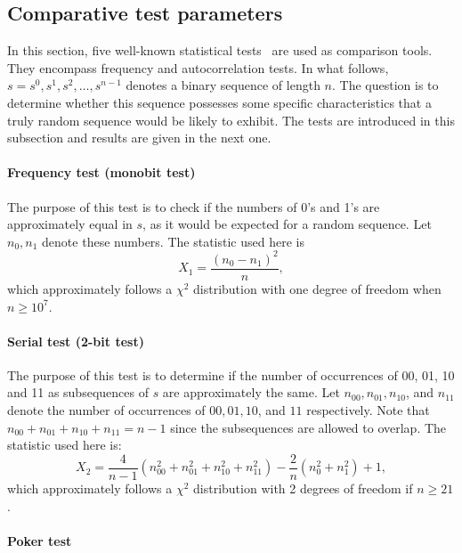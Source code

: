 \subsection{Comparative test parameters}

In this section, five well-known statistical tests~\cite{Menezes1997} are used as  comparison tools. They encompass frequency and autocorrelation tests. In what follows, $s = s^0,s^1,s^2,\dots , s^{n-1}$ denotes a binary sequence of length $n$. The question is to determine whether this sequence possesses some specific characteristics that a truly random sequence would be likely to exhibit. The tests are introduced in this subsection and results are given in the next one.

\paragraph{Frequency test (monobit test)}

The purpose of this test is to check if the numbers of 0's and 1's are approximately equal in $s$, as it would be expected for a random sequence. Let $n_0, n_1$ denote these numbers. The statistic used here is 
\begin{equation*}
X_1=\frac{(n_0-n_1)^2}{n}, 
\end{equation*}
which approximately follows a $\chi^2$ distribution with one degree of freedom when $n\geqslant 10^7$.

\paragraph{Serial test (2-bit test)}

The purpose of this test is to determine if the number of occurrences of 00, 01, 10 and 11 as subsequences of $s$ are approximately the same. Let $n_{00} , n_{01} ,n_{10}$, and $n_{11}$ denote the number of occurrences of $00, 01, 10$, and $11$ respectively. Note that $n_{00} + n_{01} + n_{10} + n_{11} = n-1$ since the subsequences are allowed to overlap. The
statistic used here is:
\begin{equation*}
X_2=\frac{4}{n-1}(n_{00}^2+n_{01}^2+n_{10}^2+n_{11}^2)-\frac{2}{n}(n_0^2+n_1^2)+1,
\end{equation*}
 which approximately follows a $\chi^2$ distribution with 2 degrees of freedom if $n\geqslant 21$.

\paragraph{Poker test}

